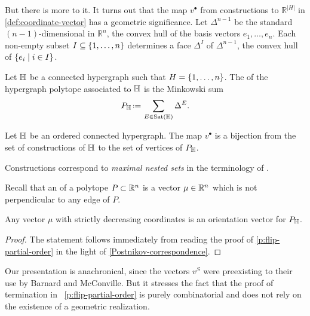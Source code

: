 But there is more to it. 
It turns out that the map $v^{\bullet}$ from constructions to $\mathbb{R}^{|H|}$
in \cref{def:coordinate-vector} has a geometric significance.  
Let $\Delta^{n-1}$ be the standard $(n-1)$-dimensional  in $\mathbb{R}^n$, the convex hull of the basis vectors $e_1,\ldots,e_n$. 
Each non-empty subset $I \subseteq \left\{1,\ldots,n\right\}$ determines a face $\Delta^I$ of $\Delta^{n-1}$, the convex hull of $\left\{e_i \mid i\in I\right\}$. 

\begin{definition}
  Let ${\mathbb H}$ be a connected hypergraph such that $H=\left\{1,\ldots,n\right\}$. 
  The  of the hypergraph polytope associated to ${\mathbb H}$ is the Minkowski sum
  $$P_{\hyper{H}}\eqdef \sum_{E\in{\Sat}(\hyper{H})} \Delta^E.$$
\end{definition}

\begin{proposition}[{\cite[Prop.~7.9]{P09}}] 
  \label{Postnikov-correspondence}
  Let ${\mathbb H}$ be an ordered connected hypergraph.
  The map $v^{\bullet}$ is a bijection from the set of constructions of ${\mathbb H}$ to the set of vertices of $P_{{\mathbb H}}$.
\end{proposition}

Constructions correspond to \emph{maximal nested sets} in the terminology of \cite{P09}.

Recall that an  of a polytope $P\subset \mathbb R^n$ is a vector $\mu \in \mathbb R^n$ which is not perpendicular to any edge of $P$. 

\begin{corollary} 
  \label{Tamari-orientation-vector}
  Any vector $\mu$ with strictly decreasing coordinates is an orientation vector for $P_{{\mathbb H}}$.
\end{corollary} 

\begin{proof}
The statement follows immediately from reading the proof of \cref{p:flip-partial-order} in the light of \cref{Postnikov-correspondence}.
\end{proof}

Our presentation is anachronical, since the vectors $v^S$ were preexisting to their use by Barnard and McConville.
But it stresses the fact that the proof of termination in~ \cref{p:flip-partial-order} is purely combinatorial and does not rely on the existence of a geometric realization.


